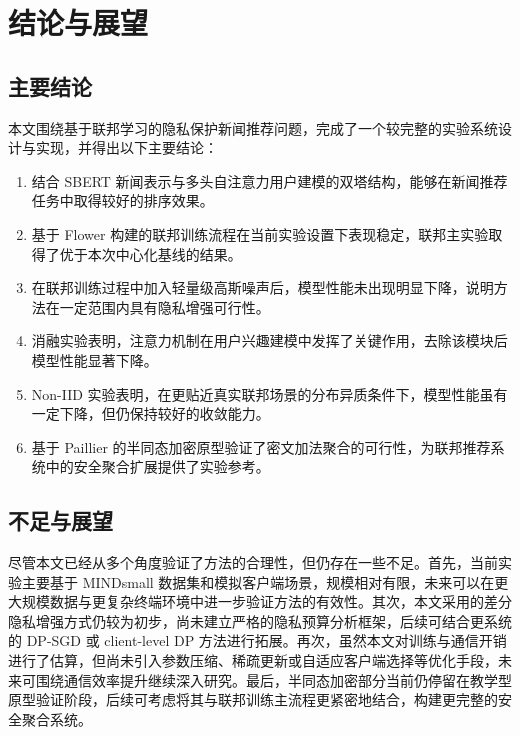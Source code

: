 \documentclass[UTF8,a4paper,12pt]{ctexart}
\numberwithin{equation}{section}
\begin{document}
\newpage
{}
\section{结论与展望}
\subsection{主要结论}
本文围绕基于联邦学习的隐私保护新闻推荐问题，完成了一个较完整的实验系统设计与实现，并得出以下主要结论：

\begin{enumerate}
\item 结合 SBERT 新闻表示与多头自注意力用户建模的双塔结构，能够在新闻推荐任务中取得较好的排序效果。
\item 基于 Flower 构建的联邦训练流程在当前实验设置下表现稳定，联邦主实验取得了优于本次中心化基线的结果。
\item 在联邦训练过程中加入轻量级高斯噪声后，模型性能未出现明显下降，说明方法在一定范围内具有隐私增强可行性。
\item 消融实验表明，注意力机制在用户兴趣建模中发挥了关键作用，去除该模块后模型性能显著下降。
\item Non-IID 实验表明，在更贴近真实联邦场景的分布异质条件下，模型性能虽有一定下降，但仍保持较好的收敛能力。
\item 基于 Paillier 的半同态加密原型验证了密文加法聚合的可行性，为联邦推荐系统中的安全聚合扩展提供了实验参考。
\end{enumerate}

\subsection{不足与展望}
尽管本文已经从多个角度验证了方法的合理性，但仍存在一些不足。首先，当前实验主要基于 MINDsmall 数据集和模拟客户端场景，规模相对有限，未来可以在更大规模数据与更复杂终端环境中进一步验证方法的有效性。其次，本文采用的差分隐私增强方式仍较为初步，尚未建立严格的隐私预算分析框架，后续可结合更系统的 DP-SGD 或 client-level DP 方法进行拓展。再次，虽然本文对训练与通信开销进行了估算，但尚未引入参数压缩、稀疏更新或自适应客户端选择等优化手段，未来可围绕通信效率提升继续深入研究。最后，半同态加密部分当前仍停留在教学型原型验证阶段，后续可考虑将其与联邦训练主流程更紧密地结合，构建更完整的安全聚合系统。
\end{document}
